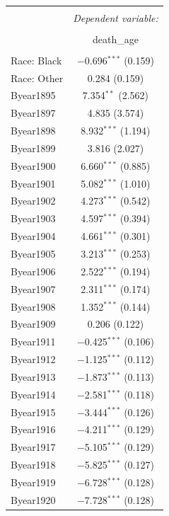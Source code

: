 \documentclass[
  11pt,
]{article}
\begin{document}
\begin{table}[] \centering 
  \caption{} 
  \label{} 
\begin{tabular}{@{\extracolsep{5pt}}lc} 
\\[-1.8ex]\hline 
\hline \\[-1.8ex] 
 & \multicolumn{1}{c}{\textit{Dependent variable:}} \\ 
\cline{2-2} 
\\[-1.8ex] & death\_age \\ 
\hline \\[-1.8ex] 
  Race: Black & $-$0.696$^{***}$ (0.159) \\ 
  Race: Other & 0.284 (0.159) \\ 
  Byear1895 & 7.354$^{**}$ (2.562) \\ 
  Byear1897 & 4.835 (3.574) \\ 
  Byear1898 & 8.932$^{***}$ (1.194) \\ 
  Byear1899 & 3.816 (2.027) \\ 
  Byear1900 & 6.660$^{***}$ (0.885) \\ 
  Byear1901 & 5.082$^{***}$ (1.010) \\ 
  Byear1902 & 4.273$^{***}$ (0.542) \\ 
  Byear1903 & 4.597$^{***}$ (0.394) \\ 
  Byear1904 & 4.661$^{***}$ (0.301) \\ 
  Byear1905 & 3.213$^{***}$ (0.253) \\ 
  Byear1906 & 2.522$^{***}$ (0.194) \\ 
  Byear1907 & 2.311$^{***}$ (0.174) \\ 
  Byear1908 & 1.352$^{***}$ (0.144) \\ 
  Byear1909 & 0.206 (0.122) \\ 
  Byear1911 & $-$0.425$^{***}$ (0.106) \\ 
  Byear1912 & $-$1.125$^{***}$ (0.112) \\ 
  Byear1913 & $-$1.873$^{***}$ (0.113) \\ 
  Byear1914 & $-$2.581$^{***}$ (0.118) \\ 
  Byear1915 & $-$3.444$^{***}$ (0.126) \\ 
  Byear1916 & $-$4.211$^{***}$ (0.129) \\ 
  Byear1917 & $-$5.105$^{***}$ (0.129) \\ 
  Byear1918 & $-$5.825$^{***}$ (0.127) \\ 
  Byear1919 & $-$6.728$^{***}$ (0.128) \\ 
  Byear1920 & $-$7.728$^{***}$ (0.128) \\ 

\end{tabular}
\end{table}
\end{document}
